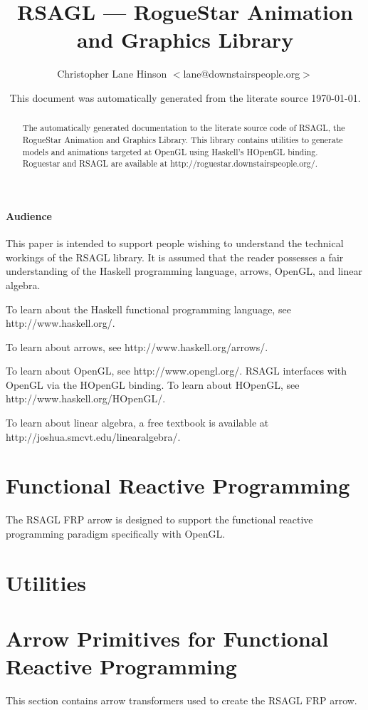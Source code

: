 \documentclass{article}
\author{Christopher Lane Hinson $<$lane@downstairspeople.org$>$}
\title{ RSAGL --- RogueStar Animation and Graphics Library }
\date{ This document was automatically generated from the literate source \today. }
\begin{document}
\maketitle

\begin{abstract}
The automatically generated documentation to the literate source code of RSAGL, 
the RogueStar Animation and Graphics Library.  This library contains utilities
to generate models and animations targeted at OpenGL using Haskell's HOpenGL
binding.  Roguestar and RSAGL are available at http://roguestar.downstairspeople.org/.
\end{abstract}

\tableofcontents

\subsection{Audience}

This paper is intended to support people wishing to understand the technical workings of
the RSAGL library.  It is assumed that the reader possesses a fair understanding
of the Haskell programming language, arrows, OpenGL, and linear algebra.

To learn about the Haskell functional programming language, see http://www.haskell.org/.

To learn about arrows, see http://www.haskell.org/arrows/.

To learn about OpenGL, see http://www.opengl.org/.  RSAGL interfaces with OpenGL via the
HOpenGL binding.  To learn about HOpenGL, see http://www.haskell.org/HOpenGL/.

To learn about linear algebra, a free textbook is available at http://joshua.smcvt.edu/linearalgebra/.

\part{Functional Reactive Programming}

The RSAGL FRP arrow is designed to support the functional reactive programming paradigm
specifically with OpenGL.




\part{Utilities}



\part{Arrow Primitives for Functional Reactive Programming}

This section contains arrow transformers used to create the RSAGL FRP arrow.





\end{document}
